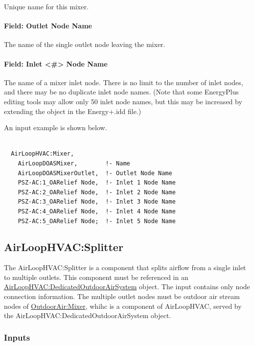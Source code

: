 Unique name for this mixer.

\paragraph{Field: Outlet Node Name}\label{field-outlet-node-name-3}

The name of the single outlet node leaving the mixer.

\paragraph{Field: Inlet \textless{}\#\textgreater{} Node Name}\label{field-inlet-node-name-3}

The name of a mixer inlet node. There is no limit to the number of inlet nodes, and there may be no duplicate inlet node names. (Note that some EnergyPlus editing tools may allow only 50 inlet node names, but this may be increased by extending the object in the Energy+.idd file.)

An input example is shown below.

\begin{lstlisting}

  AirLoopHVAC:Mixer,
    AirLoopDOASMixer,        !- Name
    AirLoopDOASMixerOutlet,  !- Outlet Node Name
    PSZ-AC:1_OARelief Node,  !- Inlet 1 Node Name
    PSZ-AC:2_OARelief Node,  !- Inlet 2 Node Name
    PSZ-AC:3_OARelief Node,  !- Inlet 3 Node Name
    PSZ-AC:4_OARelief Node,  !- Inlet 4 Node Name
    PSZ-AC:5_OARelief Node;  !- Inlet 5 Node Name
\end{lstlisting}

\subsection{AirLoopHVAC:Splitter}\label{airloophvacsplitter}

The AirLoopHVAC:Splitter is a component that splits airflow from a single inlet to multiple outlets. This component must be referenced in an \hyperref[airloophvacdedicatedoutdoorairsystem]{AirLoopHVAC:DedicatedOutdoorAirSystem} object. The input contains only node connection information. The multiple outlet nodes must be outdoor air stream nodes of \hyperref[outdoorairmixe]{OutdoorAir:Mixer}, whihc is a component of AirLoopHVAC, served by the AirLoopHVAC:DedicatedOutdoorAirSystem object.

\subsubsection{Inputs}\label{inputs-4-002}

